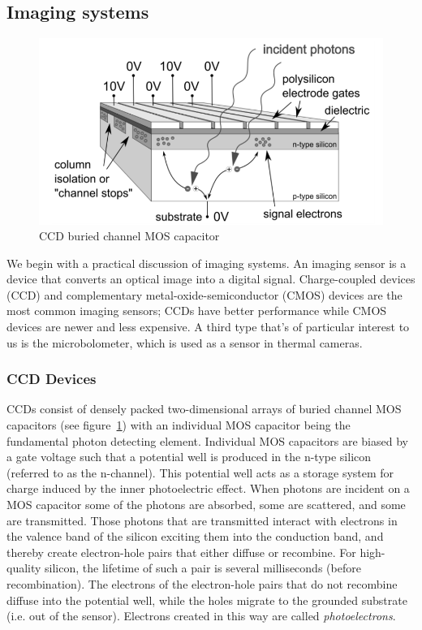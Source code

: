 \subsection{Imaging systems}\label{subsec:imaging-systems}
\begin{figure}
	\includegraphics[width=\linewidth,keepaspectratio]{figures/background/bccd.png}
	\caption{CCD buried channel MOS capacitor\cite{finaltestguideline}}
	\label{fig:mos-cap}
\end{figure}
We begin with a practical discussion of imaging systems.
%
An imaging sensor is a device that converts an optical image into a digital signal.
%
Charge-coupled devices (CCD) and complementary metal-oxide-semiconductor (CMOS) devices are the most common imaging sensors;
%
CCDs have better performance while CMOS devices are newer and less expensive.
%
A third type that's of particular interest to us is the microbolometer, which is used as a sensor in thermal cameras.
\subsubsection{CCD Devices}
CCDs consist of densely packed two-dimensional arrays of buried channel MOS capacitors (see figure~\ref{fig:mos-cap}) with an individual MOS capacitor being the fundamental photon detecting element.
%
Individual MOS capacitors are biased by a gate voltage such that a potential well is produced in the n-type silicon (referred to as the n-channel).
%
This potential well acts as a storage system for charge induced by the inner photoelectric effect.
%
When photons are incident on a MOS capacitor some of the photons are absorbed, some are scattered, and some are transmitted.
%
Those photons that are transmitted interact with electrons in the valence band of the silicon exciting them into the conduction band, and thereby create electron-hole pairs that either diffuse or recombine.
%
For high-quality silicon, the lifetime of such a pair is several milliseconds (before recombination)\cite{scientificccd}.
%
The electrons of the electron-hole pairs that do not recombine diffuse into the potential well, while the holes migrate to the grounded substrate (i.e. out of the sensor).
%
Electrons created in this way are called \textit{photoelectrons}.

